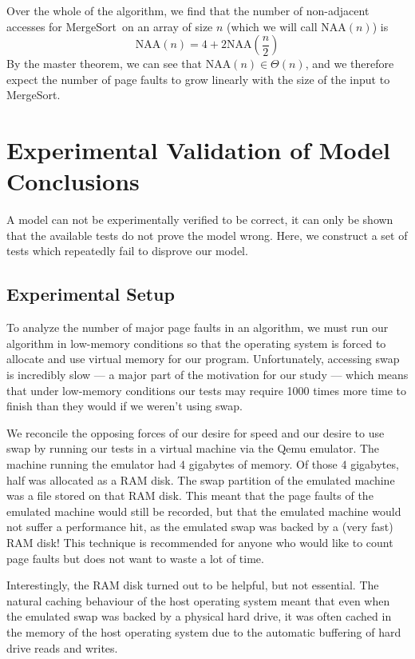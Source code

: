 \documentclass{acmtrans2m}
\newcommand{\mergesort}{{\sc MergeSort}}
\newcommand{\NAA}{\textrm{NAA}}
\begin{document}
Over the whole of the algorithm, we find that the number
of non-adjacent accesses for \mergesort\ on an array of size $n$ (which we will call $\NAA(n)$) is $$\NAA(n) = 4 + 2\NAA\left(\frac{n}{2}\right)$$
By the master theorem, we can see that $\NAA(n) \in \Theta(n)$, and
we therefore expect the number of page faults to grow linearly with the
size of the input to \mergesort.

\section{Experimental Validation of Model Conclusions}
\label{experiment}

A model can not be experimentally verified to be correct, it can only be shown
that the available tests do not prove the model wrong.  Here, we construct a
set of tests which repeatedly fail to disprove our model.

\subsection{Experimental Setup}

To analyze the number of major page faults in an algorithm, we must run our
algorithm in low-memory conditions so that the operating system is forced to
allocate and use virtual memory for our program.  Unfortunately, accessing swap
is incredibly slow --- a major part of the motivation for our study --- which
means that under low-memory conditions our tests may require 1000 times more
time to finish than they would if we weren't using swap.  

We reconcile the opposing forces of our desire for speed and our desire to use
swap by running our tests in a virtual machine via the Qemu emulator.  The
machine running the emulator had 4 gigabytes of memory.  Of those 4 gigabytes,
half was allocated as a RAM disk.  The swap partition of the emulated machine
was a file stored on that RAM disk.  This meant that the page faults of the
emulated machine would still be recorded, but that the emulated machine would
not suffer a performance hit, as the emulated swap was backed by a (very fast)
RAM disk!  This technique is recommended for anyone who would like to count
page faults but does not want to waste a lot of time.

Interestingly, the RAM disk turned out to be helpful, but not essential. The
natural caching behaviour of the host operating system meant that even when the
emulated swap was backed by a physical hard drive, it was often cached in the
memory of the host operating system due to the automatic buffering of hard drive reads and writes.
\end{document}

